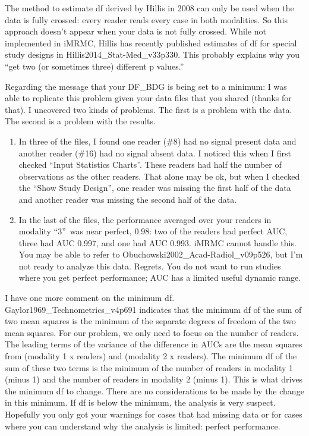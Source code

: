 \documentclass{article}%
\begin{document}
The method to estimate df derived by Hillis in 2008 can only be used when the
data is fully crossed: every reader reads every case in both modalities. So
this approach doesn't appear when your data is not fully crossed. While not
implemented in iMRMC, Hillis has recently published estimates of df for
special study designs in Hillis2014\_Stat-Med\_v33p330. This probably explains
why you \textquotedblleft get two (or sometimes three) different p
values.\textquotedblright

Regarding the message that your DF\_BDG is being set to a minimum: I was able
to replicate this problem given your data files that you shared (thanks for
that). I uncovered two kinds of problems. The first is a problem with the
data. The second is a problem with the results.

\begin{enumerate}
\item In three of the files, I found one reader (\#8) had no signal present
data and another reader (\#16) had no signal absent data. I noticed this when
I first checked \textquotedblleft Input Statistics Charts\textquotedblright.
These readers had half the number of observations as the other readers. That
alone may be ok, but when I checked the \textquotedblleft Show Study
Design\textquotedblright, one reader was missing the first half of the data
and another reader was missing the second half of the data.

\item In the last of the files, the performance averaged over your readers in
modality \textquotedblleft3\textquotedblright\ was near perfect, 0.98: two of
the readers had perfect AUC, three had AUC 0.997, and one had AUC 0.993. iMRMC
cannot handle this. You may be able to refer to
Obuchowski2002\_Acad-Radiol\_v09p526, but I'm not ready to analyze this data.
Regrets. You do not want to run studies where you get perfect performance; AUC
has a limited useful dynamic range.
\end{enumerate}

I have one more comment on the minimum df. Gaylor1969\_Technometrics\_v4p691
indicates that the minimum df of the sum of two mean squares is the minimum of
the separate degrees of freedom of the two mean squares. For our problem, we
only need to focus on the number of readers. The leading terms of the variance
of the difference in AUCs are the mean squares from (modality 1 x readers) and
(modality 2 x readers). The minimum df of the sum of these two terms is the
minimum of the number of readers in modality 1 (minus 1) and the number of
readers in modality 2 (minus 1). This is what drives the minimum df to change.
There are no considerations to be made by the change in this minimum. If df is
below the minimum, the analysis is very suspect. Hopefully you only got your
warnings for cases that had missing data or for cases where you can understand
why the analysis is limited: perfect performance.
\end{document}
